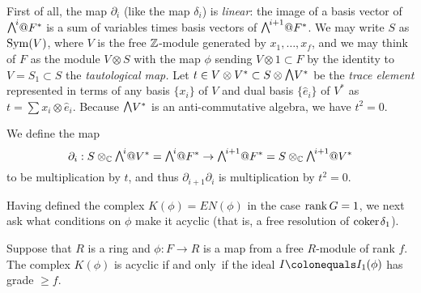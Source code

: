First of all, the map $\partial_{i}$ (like the map $\delta_{i}$) is
\emph{linear}: the image of a basis vector of $\mwedge^{i}@F^{*} $ is a
sum of variables times basis vectors
of $\mwedge^{i+1}@F^{*}$. We may write $S$ as $\operatorname{Sym}(V)$, where $V$ is the
free ${\mathbb Z}$-module generated by $x_{1}, \dots, x_{f}$, and we may think
of $F$ as the module $V\otimes S$ with the map
$\phi$ sending $V\otimes 1\subset F$ by the identity to $V = S_{1}\subset S$
\emdash the 
\emph{tautological map.}
%
Let $t\in V\otimes V^{*}\subset S\otimes \mwedge \,V^{*}$ be the \emph{trace element}
%
represented in terms of any basis $\{x_{i}\}$ of $V$
and dual basis $\{\hat e_{i}\}$ of $V^{*}$ as $t = \sum x_{i}\otimes
\hat e_{i}$. Because $\mwedge \,V^{*}$ is
an anti-commutative algebra, we have $t^{2} = 0$.

We define the map
$$
\partial_{i}: S\otimes_{\CC} \mwedge^{i}@V^{*} = \mwedge^{i}@F^{*}  \to
\mwedge^{i+1}@F^{*} = S\otimes_{\CC} \mwedge^{i+1}@V^{*}
$$
to be multiplication by $t$, and thus $\partial_{i+1}\partial_{i}$ is
multiplication by $t^{2} = 0$.

Having defined the complex $K(\phi) = EN(\phi)$ in the case $\operatorname{rank} G =
1$, we next ask what conditions on $\phi$
make it acyclic (that is, a free resolution of ${\rm{coker}\kern1pt} \delta_{1}$).

\begin{theorem}\label{rankG1}
Suppose that $R$ is a ring and $\phi: F\to R$ is a map from a free
$R$-module of rank $f$.
The complex $K(\phi)$ is acyclic if and only~if the ideal $I \colonequals
I_{1}(\phi)$ has grade $\geq f$.
%
\end{theorem}

